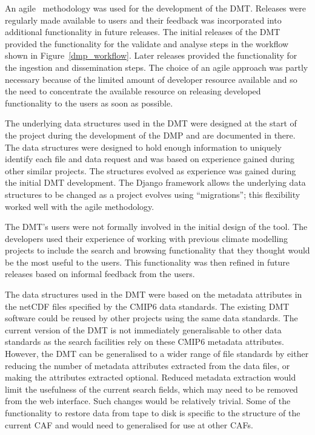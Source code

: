 \documentclass[gmd, manuscript]{copernicus}
\begin{document}
An agile~\citep{beck2001agile} methodology was used for the development of the DMT. Releases were regularly made available to users and their feedback was incorporated into additional functionality in future releases. The initial releases of the DMT provided the functionality for the validate and analyse steps in the workflow shown in Figure~\ref{dmp_workflow}. Later releases provided the functionality for the ingestion and dissemination steps. The choice of an agile approach was partly necessary because of the limited amount of developer resource available and so the need to concentrate the available resource on releasing developed functionality to the users as soon as possible. 

The underlying data structures used in the DMT were designed at the start of the project during the development of the DMP and are documented in there. The data structures were designed to hold enough information to uniquely identify each file and data request and was based on experience gained during other similar projects. The structures evolved as experience was gained during the initial DMT development. The Django framework allows the underlying data structures to be changed as a project evolves using ``migrations''; this flexibility worked well with the agile methodology.

The DMT's users were not formally involved in the initial design of the tool. The developers used their experience of working with previous climate modelling projects to include the search and browsing functionality that they thought would be the most useful to the users. This functionality was then refined in future releases based on informal feedback from the users. 

The data structures used in the DMT were based on the metadata attributes in the netCDF files specified by the CMIP6 data  standards. The existing DMT software could be reused by other projects using the same data standards. The current version of the DMT is not immediately generalisable to other data standards as the search facilities rely on these CMIP6 metadata attributes. However, the DMT can be generalised to a wider range of file standards by either reducing the number of metadata attributes extracted from the data files, or making the attributes extracted optional. Reduced metadata extraction would limit the usefulness of the current search fields, which may need to be removed from the web interface. Such changes would be relatively trivial. Some of the functionality to restore data from tape to disk is specific to the structure of the current CAF and would need to generalised for use at other CAFs.
\end{document}
